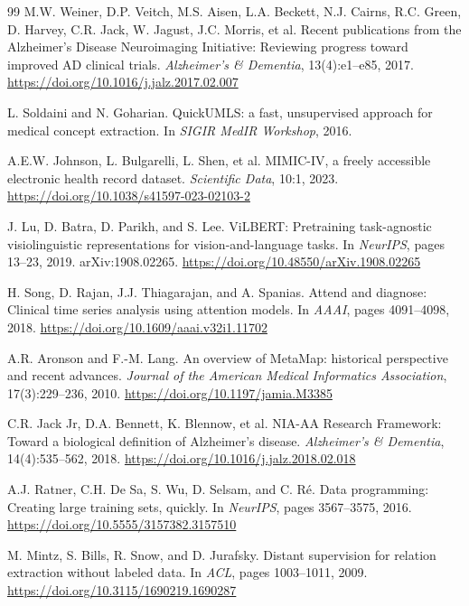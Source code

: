 \documentclass[11pt,onecolumn,a4paper]{article}
\begin{document}
\begin{thebibliography}{99}
M.W. Weiner, D.P. Veitch, M.S. Aisen, L.A. Beckett, N.J. Cairns, R.C. Green, D. Harvey, C.R. Jack, W. Jagust, J.C. Morris, et al.
\newblock Recent publications from the Alzheimer's Disease Neuroimaging Initiative: Reviewing progress toward improved AD clinical trials.
\newblock \textit{Alzheimer's \& Dementia}, 13(4):e1--e85, 2017.
\newblock \url{https://doi.org/10.1016/j.jalz.2017.02.007}

L. Soldaini and N. Goharian.
\newblock QuickUMLS: a fast, unsupervised approach for medical concept extraction.
\newblock In \textit{SIGIR MedIR Workshop}, 2016.

A.E.W. Johnson, L. Bulgarelli, L. Shen, et al.
\newblock MIMIC-IV, a freely accessible electronic health record dataset.
\newblock \textit{Scientific Data}, 10:1, 2023.
\newblock \url{https://doi.org/10.1038/s41597-023-02103-2}

J. Lu, D. Batra, D. Parikh, and S. Lee.
\newblock ViLBERT: Pretraining task-agnostic visiolinguistic representations for vision-and-language tasks.
\newblock In \textit{NeurIPS}, pages 13--23, 2019. arXiv:1908.02265.
\newblock \url{https://doi.org/10.48550/arXiv.1908.02265}

H. Song, D. Rajan, J.J. Thiagarajan, and A. Spanias.
\newblock Attend and diagnose: Clinical time series analysis using attention models.
\newblock In \textit{AAAI}, pages 4091--4098, 2018.
\newblock \url{https://doi.org/10.1609/aaai.v32i1.11702}

A.R. Aronson and F.-M. Lang.
\newblock An overview of MetaMap: historical perspective and recent advances.
\newblock \textit{Journal of the American Medical Informatics Association}, 17(3):229--236, 2010.
\newblock \url{https://doi.org/10.1197/jamia.M3385}

C.R. Jack Jr, D.A. Bennett, K. Blennow, et al.
\newblock NIA-AA Research Framework: Toward a biological definition of Alzheimer's disease.
\newblock \textit{Alzheimer's \& Dementia}, 14(4):535--562, 2018.
\newblock \url{https://doi.org/10.1016/j.jalz.2018.02.018}

A.J. Ratner, C.H. De Sa, S. Wu, D. Selsam, and C. Ré.
\newblock Data programming: Creating large training sets, quickly.
\newblock In \textit{NeurIPS}, pages 3567--3575, 2016.
\newblock \url{https://doi.org/10.5555/3157382.3157510}

M. Mintz, S. Bills, R. Snow, and D. Jurafsky.
\newblock Distant supervision for relation extraction without labeled data.
\newblock In \textit{ACL}, pages 1003--1011, 2009.
\newblock \url{https://doi.org/10.3115/1690219.1690287}


\end{thebibliography}
\end{document}
